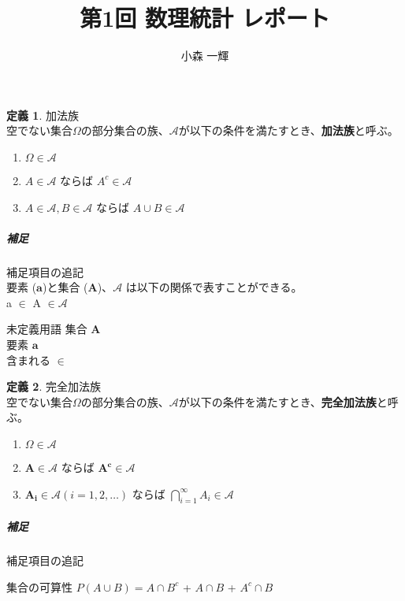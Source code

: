 \documentclass[dvipdfmx,10pt, a4j]{jarticle}
\title{第1回 数理統計 レポート}
\author{小森 一輝}
\theoremstyle{definition}
\newtheorem{definition}{定義}[section]
\begin{document}
    \maketitle

\setcounter{section}{2}
    \begin{definition} 加法族\\
    空でない集合$\Omega$の部分集合の族、$\mathcal{A}$が以下の条件を満たすとき、\textbf{加法族}と呼ぶ。
    \begin{enumerate}
        \renewcommand{\labelenumi}{\roman{enumi})}
        \item $\Omega \in \mathcal{A}$
        \item $A \in \mathcal{A}$ ならば $A^{c} \in \mathcal{A}$
        \item $A \in \mathcal{A} ,B \in \mathcal{A} $ ならば $A \cup B \in \mathcal{A}$
    \end{enumerate}
    \subparagraph*{補足}
    補足項目の追記\\
    要素 ($\bm{a}$)と集合 ($\bm{A}$)、$\mathcal{A}$ は以下の関係で表すことができる。\\
    a $\in$ A $\in \mathcal{A}$\\
    \begin{itembox}[l]{未定義用語}
        集合 $\bm{A}$\\
        要素 $\bm{a}$\\
        含まれる $\bm{\in}$
    \end{itembox}
    \end{definition}
    \begin{definition} 完全加法族\\
    空でない集合$\Omega$の部分集合の族、$\mathcal{A}$が以下の条件を満たすとき、\textbf{完全加法族}と呼ぶ。
    \begin{enumerate}
        \renewcommand{\labelenumi}{\roman{enumi})}
        \item $\Omega \in \mathcal{A}$
        \item $\bm{A} \in \mathcal{A}$ ならば $\bm{A^{c}} \in \mathcal{A}$
        \item $\bm{A_i} \in \mathcal{A}(i = 1, 2, \dots)$ ならば $\displaystyle\bigcap_{i=1}^{\infty}{A_i} \in \mathcal{A}$
    \end{enumerate}
    \subparagraph*{補足}
    補足項目の追記\\
    \begin{itembox}[l]{集合の可算性}
        $P(A \cup B) = A \cap B^{c}$ + $A \cap B$ + $A^{c} \cap B$
    \end{itembox}
    \end{definition}
\end{document}
